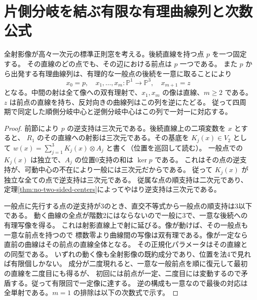 \section{片側分岐を結ぶ有限な有理曲線列と次数公式}
\label{sec:finite-branch-corridors}
\begin{theorem}\label{thm:finite-branch-corridors}
全射影像が高々一次元の標準正則窓を考える。後続直線を持つ点 $p$ を一つ固定する。
その直線のどの点でも、その辺における前点は $p$ 一つである。
また $p$ から出発する有理曲線列は、有理的な一般点の後続を一意に取ることにより
\[
 x_0=p,\quad x_1,\ldots,x_m:\mathbb P^1\longrightarrow\mathbb P^3,
 \quad x_{m+1}=z
\]
となる。中間の射は全て像への双有理射で、$x_1,x_m$ の像は直線、$m\ge2$ である。
$z$ は前点の直線を持ち、反対向きの曲線列はこの列を逆にたどる。
従って四周期で同定した順側分岐中心と逆側分岐中心はこの列で一対一に対応する。
\end{theorem}
\begin{proof}
前節により $p$ の逆支持は三次元である。後続直線上の二項変数を $x$ とすると、
$R_1$ のその直線への射影は三次元である。その基底を $K_j(x)\in V_2$ として
$w(x)=\sum_{j=1}^3 K_j(x)\otimes A_j$ と書く（位置を巡回して読む）。
一般点での $K_j(x)$ は独立で、$A_j$ の位置0支持の和は $\ker p$ である。
これはその点の逆支持が、可動中心の不在により一般には三次元だからである。
従って $K_j(x)$ が独立な全ての点で逆支持は三次元である。
従属な点の順支持は二次元であり、定理\ref{thm:no-two-sided-centers}によってやはり逆支持は三次元である。

一般点に先行する点の逆支持が3のとき、直交不等式から一般点の順支持は3以下である。
動く曲線の全点が階数2にはならないので一般に3で、一意な後続への有理写像を得る。
これは射影直線上で射に延びる。像が動けば、その一般点も一意な前点を持つので
標数零より曲線間の写像は双有理である。像が一定なら直前の曲線はその前点の直線全体となる。
その正規化パラメータはその直線との同型である。
いずれの動く像も全射影像の既約成分であり、位置を法4で見れば有限個しかない。
成分が二度現れると、一意な一般前点を順に復元して最初の直線を二度目にも得るが、
初回には前点が一定、二度目には変動するので矛盾する。従って有限回で一定像に達する。
逆の構成も一意なので最後の対応は全単射である。$m=1$ の排除は以下の次数式で示す。
\end{proof}

